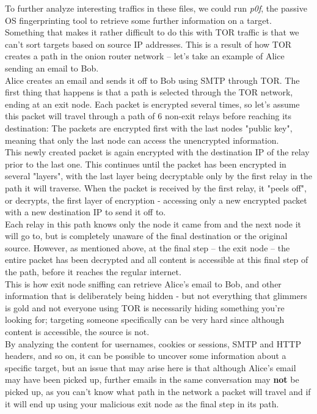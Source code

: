 To further analyze interesting traffics in these files, we could run \textit{p0f}, the passive OS fingerprinting tool to retrieve some further information on a target. Something that makes it rather difficult to do this with TOR traffic is that we can't sort targets based on source IP addresses. This is a result of how TOR creates a path in the onion router network -- let's take an example of Alice sending an email to Bob.\\

Alice creates an email and sends it off to Bob using SMTP through TOR. The first thing that happens is that a path is selected through the TOR network, ending at an exit node. Each packet is encrypted several times, so let's assume this packet will travel through a path of 6 non-exit relays before reaching its destination: The packets are encrypted first with the last nodes "public key", meaning that only the last node can access the unencrypted information. \\

This newly created packet is again encrypted with the destination IP of the relay prior to the last one. This continues until the packet has been encrypted in several "layers", with the last layer being decryptable only by the first relay in the path it will traverse. When the packet is received by the first relay, it "peels off", or decrypts, the first layer of encryption - accessing only a new encrypted packet with a new destination IP to send it off to. \\

Each relay in this path knows only the node it came from and the next node it will go to, but is completely unaware of the final destination or the original source. However, as mentioned above, at the final step -- the exit node -- the entire packet has been decrypted and all content is accessible at this final step of the path, before it reaches the regular internet.\\

This is how exit node sniffing can retrieve Alice's email to Bob, and other information that is deliberately being hidden - but not everything that glimmers is gold and not everyone using TOR is necessarily hiding something you're looking for; targeting someone specifically can be very hard since although content is accessible, the source is not.\\

By analyzing the content for usernames, cookies or sessions, SMTP and HTTP headers, and so on, it can be possible to uncover some information about a specific target, but an issue that may arise here is that although Alice's email may have been picked up, further emails in the same conversation may \textbf{not} be picked up, as you can't know what path in the network a packet will travel and if it will end up using your malicious exit node as the final step in its path.\\

